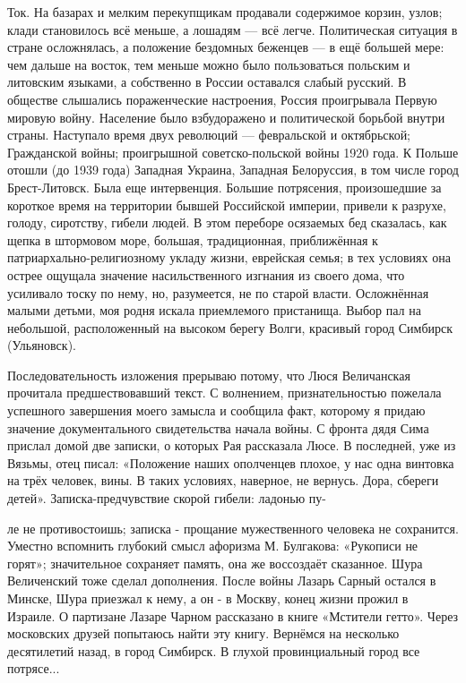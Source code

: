 Ток. На базарах и мелким перекупщикам продавали содержимое корзин, узлов; клади становилось всё меньше, а лошадям — всё легче. Политическая ситуация в стране осложнялась, а положение бездомных беженцев — в ещё большей мере: чем дальше на восток, тем меньше можно было пользоваться польским и литовским языками, а собственно в России оставался слабый русский. В обществе слышались пораженческие настроения, Россия проигрывала Первую мировую войну. Население было взбудоражено и политической борьбой внутри страны. Наступало время двух революций — февральской и октябрьской; Гражданской войны; проигрышной советско-польской войны 1920 года. К Польше отошли (до 1939 года) Западная Украина, Западная Белоруссия, в том числе город Брест-Литовск. Была еще интервенция. Большие потрясения, произошедшие за короткое время на территории бывшей Российской империи, привели к разрухе, голоду, сиротству, гибели людей. В этом переборе осязаемых бед сказалась, как щепка в штормовом море, большая, традиционная, приближённая к патриархально-религиозному укладу жизни, еврейская семья; в тех условиях она острее ощущала значение насильственного изгнания из своего дома, что усиливало тоску по нему, но, разумеется, не по старой власти. Осложнённая малыми детьми, моя родня искала приемлемого пристанища. Выбор пал на небольшой, расположенный на высоком берегу Волги, красивый город Симбирск (Ульяновск).

Последовательность изложения прерываю потому, что Люся Величанская прочитала предшествовавший текст. С волнением, признательностью пожелала успешного завершения моего замысла и сообщила факт, которому я придаю значение документального свидетельства начала войны. С фронта дядя Сима прислал домой две записки, о которых Рая рассказала Люсе. В последней, уже из Вязьмы, отец писал: «Положение наших ополченцев плохое, у нас одна винтовка на трёх человек, вины. В таких условиях, наверное, не вернусь. Дора, сбереги детей». Записка-предчувствие скорой гибели: ладонью пу-

ле не противостоишь; записка - прощание мужественного человека не сохранится. Уместно вспомнить глубокий смысл афоризма М. Булгакова: «Рукописи не горят»; значительное сохраняет память, она же воссоздаёт сказанное. Шура Величенский тоже сделал дополнения. После войны Лазарь Сарный остался в Минске, Шура приезжал к нему, а он - в Москву, конец жизни прожил в Израиле. О партизане Лазаре Чарном рассказано в книге «Мстители гетто». Через московских друзей попытаюсь найти эту книгу. Вернёмся на несколько десятилетий назад, в город Симбирск. В глухой провинциальный город все потрясе...

